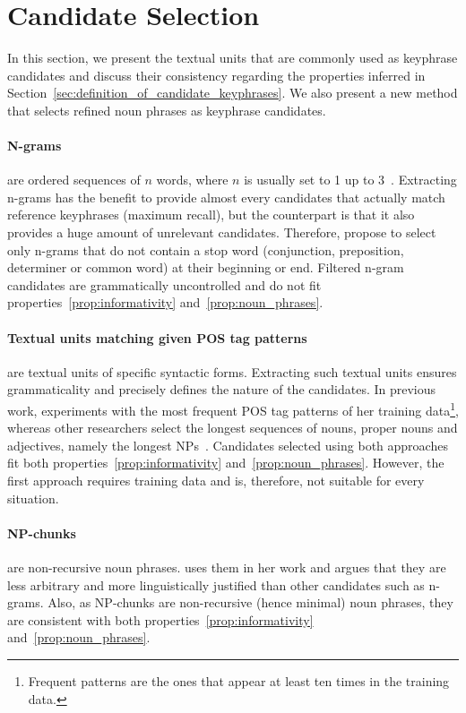 \section{Candidate Selection}
\label{sec:candidate_extraction}
  In this section, we present the textual units that are commonly used as
  keyphrase candidates and discuss their consistency regarding the properties
  inferred in Section~\ref{sec:definition_of_candidate_keyphrases}. We also
  present a new method that selects refined noun phrases as keyphrase
  candidates.

  \paragraph{N-grams} are ordered sequences of $n$ words, where $n$ is usually
  set to 1 up to 3~\cite{witten1999kea}. Extracting n-grams has the benefit to
  provide almost every candidates that actually match reference keyphrases
  (maximum recall), but the counterpart is that it also provides a huge amount
  of unrelevant candidates. Therefore,  propose to
  select only n-grams that do not contain a stop word (conjunction, preposition,
  determiner or common word) at their beginning or end. Filtered n-gram
  candidates are grammatically uncontrolled and do not fit
  properties~\ref{prop:informativity} and~\ref{prop:noun_phrases}.

  \paragraph{Textual units matching given POS tag patterns} are textual units of
  specific syntactic forms. Extracting such textual units ensures grammaticality
  and precisely defines the nature of the candidates. In previous work,
   experiments with the most frequent POS
  tag patterns of her training data\footnote{Frequent patterns are the ones that
  appear at least ten times in the training data.}, whereas other researchers
  select the longest sequences of nouns, proper nouns and adjectives, namely
  the longest NPs~\cite{hassan2010conundrums}. Candidates selected using both
  approaches fit both properties~\ref{prop:informativity}
  and~\ref{prop:noun_phrases}. However, the first approach requires training
  data and is, therefore, not suitable for every situation.

  \paragraph{NP-chunks} are non-recursive noun phrases.
   uses them in her work and argues that
  they are less arbitrary and more linguistically justified than other
  candidates such as n-grams. Also, as NP-chunks are non-recursive (hence
  minimal) noun phrases, they are consistent with both
  properties~\ref{prop:informativity} and~\ref{prop:noun_phrases}.

